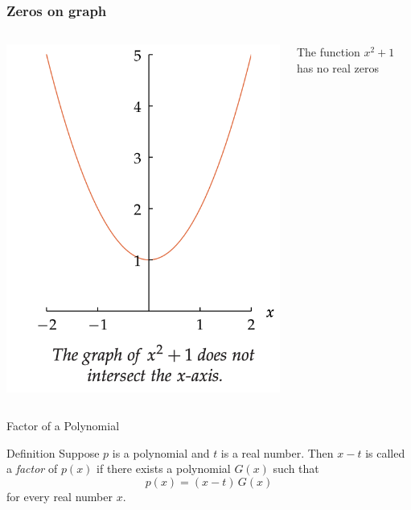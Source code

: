 \documentclass{beamer}
\begin{document}
\begin{frame}
  \frametitle{Zeros on graph}
  \begin{columns}
    \begin{column}{0.5\textwidth}
      \centering
      \includegraphics[scale=0.3]{no-real-zeros.png}
    \end{column}
    \begin{column}{0.5\textwidth}
      The function \(x^{2}+1\) has no real zeros 
    \end{column}
  \end{columns}
\end{frame}

\begin{frame}{Factor of a Polynomial}
  \begin{block}{Definition}
    Suppose \(p\) is a polynomial and \(t\) is a real number. Then \(x-t\) is called a \emph{factor} of \(p(x)\) if there exists a polynomial \(G(x)\) such that
    \[
      p(x) = (x-t)\,G(x)
    \]
    for every real number \(x\).
  \end{block}
\end{frame}
\end{document}
